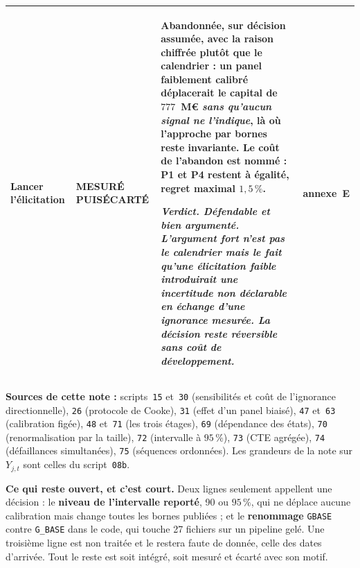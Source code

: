 \documentclass[11pt,a4paper]{article}
\newcommand{\ecarte}{\cellcolor{ambre}\footnotesize\textbf{MESURÉ PUIS}\newline\footnotesize\textbf{ÉCARTÉ}}
\newcommand{\verdict}[1]{\par\smallskip\emph{\textbf{Verdict.} #1}}
\begin{document}
{\begin{longtable}{@{}p{3.4cm} >{\raggedright\arraybackslash\hyphenpenalty=10000\exhyphenpenalty=10000}p{2.4cm} p{8.7cm} p{2.0cm}@{}}
Lancer l'élicitation &
\ecarte &
\textbf{Abandonnée, sur décision assumée}, avec la raison chiffrée plutôt que le calendrier : un
panel faiblement calibré déplacerait le capital de $777$~M\euro{} \emph{sans qu'aucun signal ne
l'indique}, là où l'approche par bornes reste invariante. Le coût de l'abandon est nommé : P1 et
P4 restent à égalité, regret maximal $1{,}5\,\%$.
\verdict{Défendable et bien argumenté. L'argument fort n'est pas le calendrier mais le fait qu'une
élicitation faible introduirait une incertitude \textbf{non déclarable} en échange d'une ignorance
mesurée. La décision reste réversible sans coût de développement.} &
annexe~E \\
\bottomrule
\end{longtable}
}

\vspace{0.15cm}
{\scriptsize\noindent\textbf{Sources de cette note :} scripts~\texttt{15} et~\texttt{30}
(sensibilités et coût de l'ignorance directionnelle), \texttt{26} (protocole de Cooke),
\texttt{31} (effet d'un panel biaisé), \texttt{47} et~\texttt{63} (calibration figée),
\texttt{48} et~\texttt{71} (les trois étages), \texttt{69} (dépendance des états),
\texttt{70} (renormalisation par la taille), \texttt{72} (intervalle à $95\,\%$),
\texttt{73} (CTE agrégée), \texttt{74} (défaillances simultanées), \texttt{75} (séquences
ordonnées). Les grandeurs de la note sur $Y_{j,t}$ sont celles du script~\texttt{08b}.\par}

\vspace{0.2cm}
\begin{cle}
\textbf{Ce qui reste ouvert, et c'est court.} Deux lignes seulement appellent une décision : le
\textbf{niveau de l'intervalle reporté}, 90 ou $95\,\%$, qui ne déplace aucune calibration mais
change toutes les bornes publiées ; et le \textbf{renommage} \texttt{GBASE} contre
\texttt{G\_BASE} dans le code, qui touche 27 fichiers sur un pipeline gelé. Une troisième ligne
est non traitée et le restera faute de donnée, celle des dates d'arrivée. Tout le reste est soit
intégré, soit mesuré et écarté avec son motif.
\end{cle}
\end{document}
